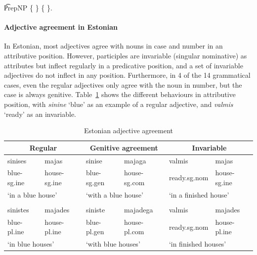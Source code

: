 \begin{EmptyItem}
\t{PrepNP} \{  \} 
           \{  \}. 
\end{EmptyItem}

\paragraph{Adjective agreement in Estonian} In Estonian,
most adjectives agree with nouns in case and number in an attributive
position. However, participles are invariable (singular nominative) as 
attributes but inflect regularly in a predicative position, and a set
of invariable adjectives do not inflect in any position. Furthermore,
in 4 of the 14 grammatical cases, even the regular adjectives only
agree with the noun in number, but the case is always genitive.
Table~\ref{estonian} shows the different behaviours in attributive
position, with \emph{sinine} `blue' as an example of a regular
adjective, and \emph{valmis} `ready' as an invariable.

\begin{table}[h]
\small
\begin{tabular}{ll | ll | ll}

\multicolumn{2}{c|}{\bf Regular} & \multicolumn{2}{c|}{\bf Genitive
                                   agreement} & \multicolumn{2}{c}{\bf
                                                Invariable} \\ \hline
 sinises & majas &  sinise & majaga &  valmis & majas \\
blue-{\sc sg.ine} & house-{\sc sg.ine} & blue-{\sc sg.gen} & house-{\sc sg.com} &  ready.{\sc sg.nom} & house-{\sc sg.ine} \\
\multicolumn{2}{l|}{`in a blue house'} & \multicolumn{2}{l|}{`with a blue house'} & \multicolumn{2}{l}{`in a finished house'} \\
 & & & & & \\
sinistes & majades & siniste & majadega & valmis & majades \\
blue-{\sc pl.ine} & house-{\sc pl.ine} & blue-{\sc pl.gen} & house-{\sc pl.com} & ready.{\sc sg.nom} & house-{\sc pl.ine} \\
\multicolumn{2}{l|}{`in blue houses'} & \multicolumn{2}{l|}{`with blue
                                         houses'} &
                                                     \multicolumn{2}{l}{`in finished houses'}

\end{tabular}
\caption{Estonian adjective agreement}
\label{estonian}
\end{table}

